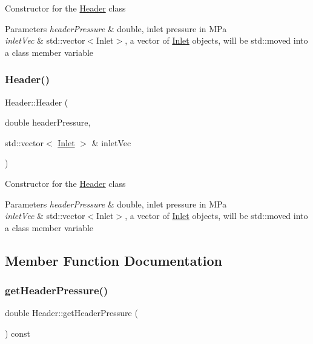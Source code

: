 Constructor for the \hyperlink{class_header}{Header} class


\begin{DoxyParams}{Parameters}
{\em header\+Pressure} & double, inlet pressure in M\+Pa \\
\hline
{\em inlet\+Vec} & std\+::vector$<$\+Inlet$>$, a vector of \hyperlink{class_inlet}{Inlet} objects, will be std\+::moved into a class member variable \\
\hline
\end{DoxyParams}
\mbox{\label{class_header_a59b836abde0be58bec65ebea1ac67a3b}} 
\subsubsection{\texorpdfstring{Header()}{Header()}\hspace{0.1cm}{\footnotesize\ttfamily [3/3]}}
{\footnotesize\ttfamily Header\+::\+Header (\begin{DoxyParamCaption}\item[{double}]{header\+Pressure,  }\item[{std\+::vector$<$ \hyperlink{class_inlet}{Inlet} $>$ \&}]{inlet\+Vec }\end{DoxyParamCaption})}

Constructor for the \hyperlink{class_header}{Header} class


\begin{DoxyParams}{Parameters}
{\em header\+Pressure} & double, inlet pressure in M\+Pa \\
\hline
{\em inlet\+Vec} & std\+::vector$<$\+Inlet$>$, a vector of \hyperlink{class_inlet}{Inlet} objects, will be std\+::moved into a class member variable \\
\hline
\end{DoxyParams}


\subsection{Member Function Documentation}
\mbox{\label{class_header_adc2e6daaf9f5e633c3db96ff3990f1f6}} 
\subsubsection{\texorpdfstring{get\+Header\+Pressure()}{getHeaderPressure()}\hspace{0.1cm}{\footnotesize\ttfamily [1/3]}}
{\footnotesize\ttfamily double Header\+::get\+Header\+Pressure (\begin{DoxyParamCaption}{ }\end{DoxyParamCaption}) const\hspace{0.3cm}{\ttfamily [inline]}}

